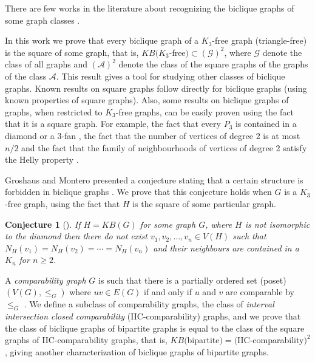 \documentclass{article}
\newcommand{\define}[1]{\emph{#1}}
\newcommand{\mA}{\ensuremath{\mathcal{A}}}
\newcommand{\mG}{\ensuremath{\mathcal{G}}}
\newtheorem{conjecture}{Conjecture}
\begin{document}
There are  few works  in the literature  about recognizing  the biclique
graphs            of            some            graph            classes
\cite{CruzGroshausGuedesPuppo2020,GroshausGuedesPuppo2016,Groshaus2006,Puppo2019}.

In this  work we prove that  every biclique graph of  a $K_3$-free graph
(triangle-free)   is    the   square    of   some   graph,    that   is,
$KB(K_3$-free$) \subset  (\mG)^2$, where $\mG$  denote the class  of all
graphs and $(\mA)^2$ denote the class of the square graphs of the graphs
of the class $\mA$.  This result gives a tool for studying other classes
of biclique graphs.
Known  results on  square  graphs follow  directly  for biclique  graphs
(using  known  properties of  square  graphs).   Also, some  results  on
biclique graphs of graphs, when  restricted to $K_3$-free graphs, can be
easily proven using the fact that it is a square graph. For example, the
fact  that  every  $P_3$  is  contained   in  a  diamond  or  a  $3$-fan
\cite{Groshaus2010}, the fact that the  number of vertices of degree $2$
is  at most  $n/2$ and  the  fact that  the family  of neighbourhoods  of
vertices     of    degree     2    satisfy     the    Helly     property
\cite{GroshausMontero2019}. 

Groshaus and Montero presented a conjecture stating that
a certain structure is forbidden in biclique graphs \cite[Conjecture 6.2]{GroshausMontero2019}.
We prove that this conjecture  holds when  $G$ is a  $K_3$-free graph,
using the fact that $H$ is the square of some particular  graph.

\begin{conjecture}[\cite{GroshausMontero2019}]
  \label{conj.montero}
  If $H=KB(G)$  for some graph $G$,  where $H$ is not  isomorphic to the
  diamond then there do not exist  $v_1, v_2, \ldots, v_n \in V(H)$ such
  that $N_H(v_1)  = N_H(v_2) =  \cdots = N_H(v_n)$ and  their neighbours
  are contained in a $K_n$ for $n \geq 2$.
\end{conjecture}

A  \define{comparability graph}  $G$ is  such that  there is  a partially
ordered set (poset) $(V(G),\leq_G)$ where $uv \in E(G)$ if and
only if $u$ and $v$ are comparable by $\leq_G$ \cite{Brandstaedt1999}.
%
%
We define a subclass of comparability graphs, the class
of      \define{interval     intersection      closed     comparability}
(IIC-comparability)  graphs, and  we prove  that the  class of  biclique
graphs of bipartite graphs is equal to the class of the square graphs of
IIC-comparability              graphs,             that              is,
$KB($bipartite$)    =     ($IIC-comparability$)^2$,    giving    another
characterization of biclique graphs of bipartite graphs.
\end{document}
